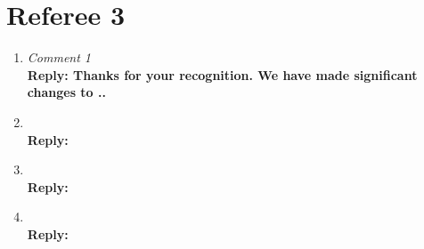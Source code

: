 \documentclass[report]{geophysics}
\begin{document}
\section{Referee 3}
\begin{enumerate}
\item \emph{  Comment 1} \\
\textbf{Reply: Thanks for your recognition. We have made significant changes to ..}

\item \emph{  } \\
\textbf{Reply: }

\item \emph{  } \\
\textbf{Reply:}

\item \emph{ } \\
\textbf{Reply: }

\end{enumerate}


%
%
\end{document}

